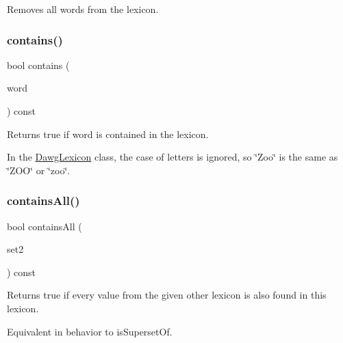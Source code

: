 Removes all words from the lexicon. 

\mbox{\label{classDawgLexicon_a479b1bac4a3c243907c80e5c6f9b05d5}} 
\subsubsection{\texorpdfstring{contains()}{contains()}}
{\footnotesize\ttfamily bool contains (\begin{DoxyParamCaption}\item[{const std\+::string \&}]{word }\end{DoxyParamCaption}) const}



Returns {\ttfamily true} if {\ttfamily word} is contained in the lexicon. 

In the {\ttfamily \mbox{\hyperlink{classDawgLexicon}{Dawg\+Lexicon}}} class, the case of letters is ignored, so \char`\"{}\+Zoo\char`\"{} is the same as \char`\"{}\+Z\+O\+O\char`\"{} or \char`\"{}zoo\char`\"{}. \mbox{\label{classDawgLexicon_acda62a676d80199487fe846670f6294a}} 
\subsubsection{\texorpdfstring{contains\+All()}{containsAll()}\hspace{0.1cm}{\footnotesize\ttfamily [1/2]}}
{\footnotesize\ttfamily bool contains\+All (\begin{DoxyParamCaption}\item[{const \mbox{\hyperlink{classDawgLexicon}{Dawg\+Lexicon}} \&}]{set2 }\end{DoxyParamCaption}) const}



Returns {\ttfamily true} if every value from the given other lexicon is also found in this lexicon. 

Equivalent in behavior to is\+Superset\+Of. \mbox{\label{classDawgLexicon_a3934298595e72e6540e5f81d47ab763a}} 
